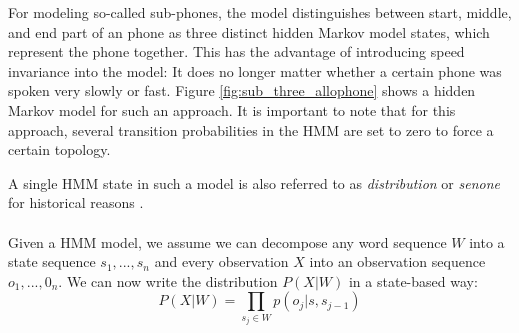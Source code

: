 For modeling so-called sub-phones, the model distinguishes between start, middle, and end part of an phone as three distinct hidden Markov model states, which represent the phone together. This has the advantage of introducing speed invariance into the model: It does no longer matter whether a certain phone was spoken very slowly or fast. Figure \ref{fig:sub_three_allophone} shows a hidden Markov model for such an approach. It is important to note that for this approach, several transition probabilities in the HMM are set to zero to force a certain topology. \\
\begin{minipage}{\linewidth}
	\label{fig:sub_three_allophone}
	\hspace{1cm}
\end{minipage}
A single HMM state in such a model is also referred to as \textit{distribution} or \textit{senone} for historical reasons \cite{yu2016automatic}. \\ \\
Given a HMM model, we assume we can decompose any word sequence $W$ into a state sequence $s_1,...,s_n$ and every observation $X$ into an observation sequence $o_1,...,0_n$. We can now write the distribution $P(X|W)$ in a state-based way:
\[
P(X|W) = \prod_{s_j \in W} p(o_j | s, s_{j - 1})
\]
